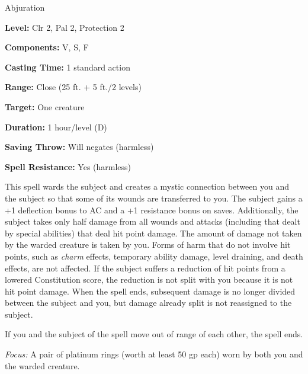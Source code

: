 
Abjuration

\textbf{Level:} Clr 2, Pal 2, Protection 2

\textbf{Components:} V, S, F

\textbf{Casting Time:} 1 standard action

\textbf{Range:} Close (25 ft. + 5 ft./2 levels)

\textbf{Target:} One creature

\textbf{Duration:} 1 hour/level (D)

\textbf{Saving Throw:} Will negates (harmless)

\textbf{Spell Resistance:} Yes (harmless)

This spell wards the subject and creates a mystic connection between you and the 
subject so that some of its wounds are transferred to you. The subject gains a 
+1 deflection bonus to AC and a +1 resistance bonus on saves. Additionally, the 
subject takes only half damage from all wounds and attacks (including that dealt 
by special abilities) that deal hit point damage. The amount of damage not taken 
by the warded creature is taken by you. Forms of harm that do not involve hit points, 
such as \textit{charm} effects, temporary ability damage, level draining, and death 
effects, are not affected. If the subject suffers a reduction of hit points from 
a lowered Constitution score, the reduction is not split with you because it is 
not hit point damage. When the spell ends, subsequent damage is no longer divided 
between the subject and you, but damage already split is not reassigned to the 
subject.

If you and the subject of the spell move out of range of each other, the spell 
ends.

\textit{Focus:} A pair of platinum rings (worth at least 50 gp each) worn by both 
you and the warded creature.

